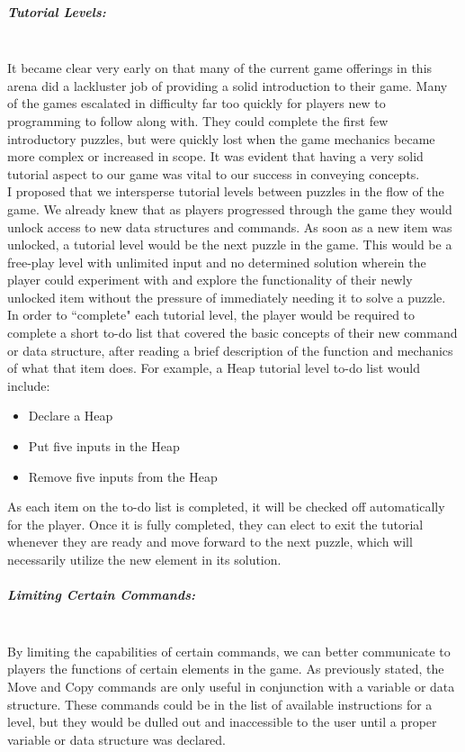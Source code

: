 \subparagraph{Tutorial Levels:}\mbox{} \\
It became clear very early on that many of the current game offerings in this arena did a lackluster job of 
providing a solid introduction to their game. Many of the games escalated in difficulty far too quickly for 
players new to programming to follow along with. They could complete the first few introductory puzzles,
but were quickly lost when the game mechanics became more complex or increased in scope. It was evident
that having a very solid tutorial aspect to our game was vital to our success in conveying concepts.\\

I proposed that we intersperse tutorial levels between puzzles in the flow of the game. We already knew that
as players progressed through the game they would unlock access to new data structures and commands. As
soon as a new item was unlocked, a tutorial level would be the next puzzle in the game. This would be a free-play
level with unlimited input and no determined solution wherein the player could experiment with and explore
the functionality of their newly unlocked item without the pressure of immediately needing it to solve a puzzle.\\

In order to ``complete" each tutorial level, the player would be required to complete a short to-do list that
covered the basic concepts of their new command or data structure, after reading a brief description of the function
and mechanics of what that item does. For example, a Heap tutorial level to-do list would include:
\begin{itemize}
	\item Declare a Heap
	\item Put five inputs in the Heap
	\item Remove five inputs from the Heap
\end{itemize}
As each item on the to-do list is completed, it will be checked off automatically for the player. Once it is fully 
completed, they can elect to exit the tutorial whenever they are ready and move forward to the next 
puzzle, which will necessarily utilize the new element in its solution. \\

\subparagraph{Limiting Certain Commands:}\mbox{} \\
By limiting the capabilities of certain commands, we can better communicate to players the functions of certain
elements in the game. As previously stated, the Move and Copy commands are only useful in conjunction with a
variable or data structure. These commands could be in the list of available instructions for a level, but they would be
dulled out and inaccessible to the user until a proper variable or data structure was declared.\\

